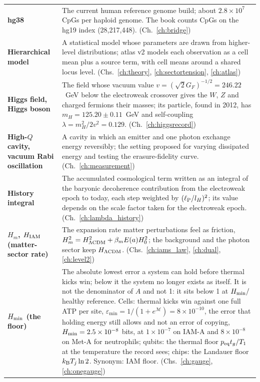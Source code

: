 {\begin{longtable}{@{}>{\raggedright\arraybackslash}p{}>{\raggedright\arraybackslash}p{}@{}}
\textbf{hg38} & The current human reference genome build; about $2.8\times10^7$ CpGs per haploid genome. The book counts CpGs on the hg19 index (28,217,448). {\footnotesize(Ch.~\ref{ch:bridge})}\\[1pt]
\textbf{Hierarchical model} & A statistical model whose parameters are drawn from higher-level distributions; atlas v2 models each observation as a cell mean plus a source term, with cell means around a shared locus level. {\footnotesize(Chs.~\ref{ch:theory}, \ref{ch:sectortension}, \ref{ch:atlas})}\\[1pt]
\textbf{Higgs field, Higgs boson} & The field whose vacuum value $v=(\sqrt2G_F)^{-1/2}=246.22$~GeV below the electroweak crossover gives the $W$, $Z$ and charged fermions their masses; its particle, found in 2012, has $m_H=125.20\pm0.11$~GeV and self-coupling $\lambda=m_H^2/2v^2=0.129$. {\footnotesize(Ch.~\ref{ch:higgsrecord})}\\[1pt]
\textbf{High-$Q$ cavity, vacuum Rabi oscillation} & A cavity in which an emitter and one photon exchange energy reversibly; the setting proposed for varying dissipated energy and testing the erasure-fidelity curve. {\footnotesize(Ch.~\ref{ch:measurement})}\\[1pt]
\textbf{History integral} & The accumulated cosmological term written as an integral of the baryonic decoherence contribution from the electroweak epoch to today, each step weighted by $(\ell_{\mathrm P}/l_H)^2$; its value depends on the scale factor taken for the electroweak epoch. {\footnotesize(Ch.~\ref{ch:lambda_history})}\\[1pt]
\textbf{$H_m$, $H_{\rm IAM}$ (matter-sector rate)} & The expansion rate matter perturbations feel as friction, $H_m^2=H^2_{\Lambda\rm CDM}+\beta_mE(a)H_0^2$; the background and the photon sector keep $H_{\Lambda\rm CDM}$. {\footnotesize(Chs.~\ref{ch:iams_law}, \ref{ch:dual}, \ref{ch:level2})}\\[1pt]
\textbf{$H_{\min}$ (the floor)} & The absolute lowest error a system can hold before thermal kicks win; below it the system no longer exists as itself. It is not the denominator of $A$ and not 1: it sits below 1 at $H_{\min}/$healthy reference. Cells: thermal kicks win against one full ATP per site, $\varepsilon_{\min}=1/(1+e^{\mathcal M})=8\times10^{-10}$, the error that holding energy still allows and not an error of copying, $H_{\min}=2.5\times10^{-8}$ bits, at $1\times10^{-7}$ on IAM-A and $8\times10^{-8}$ on Met-A for neutrophils; qubits: the thermal floor $p_{\rm eq}t_g/T_1$ at the temperature the record sees; chips: the Landauer floor $k_{\mathrm B} T_j\ln2$. Synonym: IAM floor. {\footnotesize(Chs.~\ref{ch:gauge}, \ref{ch:onegauge})}\\[1pt]

\end{longtable}}
